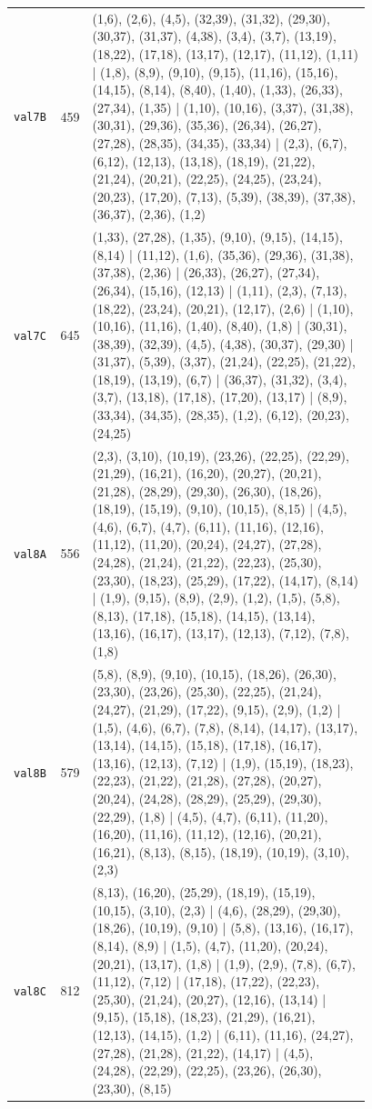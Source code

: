\begin{landscape}
\begin{longtable}{lr>{\tiny\raggedright\arraybackslash}p{0.78\linewidth}}
\texttt{val7B} & 459 & (1,6), (2,6), (4,5), (32,39), (31,32), (29,30), (30,37), (31,37), (4,38), (3,4), (3,7), (13,19), (18,22), (17,18), (13,17), (12,17), (11,12), (1,11) | (1,8), (8,9), (9,10), (9,15), (11,16), (15,16), (14,15), (8,14), (8,40), (1,40), (1,33), (26,33), (27,34), (1,35) | (1,10), (10,16), (3,37), (31,38), (30,31), (29,36), (35,36), (26,34), (26,27), (27,28), (28,35), (34,35), (33,34) | (2,3), (6,7), (6,12), (12,13), (13,18), (18,19), (21,22), (21,24), (20,21), (22,25), (24,25), (23,24), (20,23), (17,20), (7,13), (5,39), (38,39), (37,38), (36,37), (2,36), (1,2) \\[2pt]
\texttt{val7C} & 645 & (1,33), (27,28), (1,35), (9,10), (9,15), (14,15), (8,14) | (11,12), (1,6), (35,36), (29,36), (31,38), (37,38), (2,36) | (26,33), (26,27), (27,34), (26,34), (15,16), (12,13) | (1,11), (2,3), (7,13), (18,22), (23,24), (20,21), (12,17), (2,6) | (1,10), (10,16), (11,16), (1,40), (8,40), (1,8) | (30,31), (38,39), (32,39), (4,5), (4,38), (30,37), (29,30) | (31,37), (5,39), (3,37), (21,24), (22,25), (21,22), (18,19), (13,19), (6,7) | (36,37), (31,32), (3,4), (3,7), (13,18), (17,18), (17,20), (13,17) | (8,9), (33,34), (34,35), (28,35), (1,2), (6,12), (20,23), (24,25) \\[2pt]
\texttt{val8A} & 556 & (2,3), (3,10), (10,19), (23,26), (22,25), (22,29), (21,29), (16,21), (16,20), (20,27), (20,21), (21,28), (28,29), (29,30), (26,30), (18,26), (18,19), (15,19), (9,10), (10,15), (8,15) | (4,5), (4,6), (6,7), (4,7), (6,11), (11,16), (12,16), (11,12), (11,20), (20,24), (24,27), (27,28), (24,28), (21,24), (21,22), (22,23), (25,30), (23,30), (18,23), (25,29), (17,22), (14,17), (8,14) | (1,9), (9,15), (8,9), (2,9), (1,2), (1,5), (5,8), (8,13), (17,18), (15,18), (14,15), (13,14), (13,16), (16,17), (13,17), (12,13), (7,12), (7,8), (1,8) \\[2pt]
\texttt{val8B} & 579 & (5,8), (8,9), (9,10), (10,15), (18,26), (26,30), (23,30), (23,26), (25,30), (22,25), (21,24), (24,27), (21,29), (17,22), (9,15), (2,9), (1,2) | (1,5), (4,6), (6,7), (7,8), (8,14), (14,17), (13,17), (13,14), (14,15), (15,18), (17,18), (16,17), (13,16), (12,13), (7,12) | (1,9), (15,19), (18,23), (22,23), (21,22), (21,28), (27,28), (20,27), (20,24), (24,28), (28,29), (25,29), (29,30), (22,29), (1,8) | (4,5), (4,7), (6,11), (11,20), (16,20), (11,16), (11,12), (12,16), (20,21), (16,21), (8,13), (8,15), (18,19), (10,19), (3,10), (2,3) \\[2pt]
\texttt{val8C} & 812 & (8,13), (16,20), (25,29), (18,19), (15,19), (10,15), (3,10), (2,3) | (4,6), (28,29), (29,30), (18,26), (10,19), (9,10) | (5,8), (13,16), (16,17), (8,14), (8,9) | (1,5), (4,7), (11,20), (20,24), (20,21), (13,17), (1,8) | (1,9), (2,9), (7,8), (6,7), (11,12), (7,12) | (17,18), (17,22), (22,23), (25,30), (21,24), (20,27), (12,16), (13,14) | (9,15), (15,18), (18,23), (21,29), (16,21), (12,13), (14,15), (1,2) | (6,11), (11,16), (24,27), (27,28), (21,28), (21,22), (14,17) | (4,5), (24,28), (22,29), (22,25), (23,26), (26,30), (23,30), (8,15) \\[2pt]

\end{longtable}
\end{landscape}
